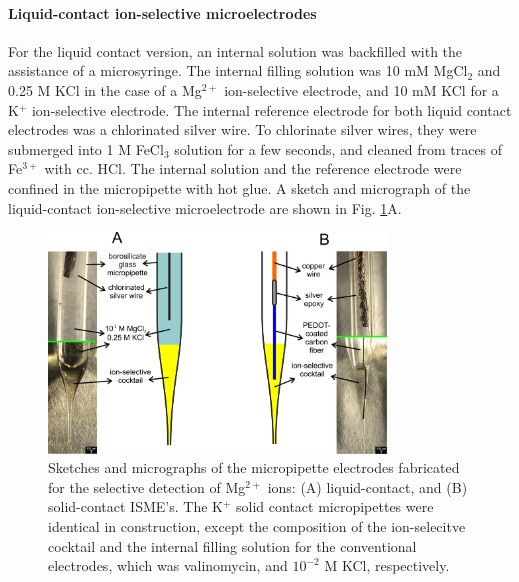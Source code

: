				\paragraph{Liquid-contact ion-selective microelectrodes}
For the liquid contact version, an internal solution was backfilled with the assistance of a microsyringe.
The internal filling solution was 10 mM MgCl$_2$ and 0.25 M KCl in the case of a Mg$^{2+}$ ion-selective electrode, and 10 mM KCl for a K$^+$ ion-selective electrode.
The internal reference electrode for both liquid contact electrodes was a chlorinated silver wire.
To chlorinate silver wires, they were submerged into 1 M FeCl$_3$ solution for a few seconds, and cleaned from traces of Fe$^{3+}$ with cc. HCl.
The internal solution and the reference electrode were confined in the micropipette with hot glue.
A sketch and micrograph of the liquid-contact ion-selective microelectrode are shown in Fig. \ref{fig:solid_liquid}A.

\begin{figure}
\centering
\includegraphics[width=0.8\textwidth]{img/liquid_solid.jpg}
\caption[Sketches and micrographs of the micropipette electrodes fabricated for the selective detection of Mg$^{2+}$ ions.]{Sketches and micrographs of the micropipette electrodes fabricated for the selective detection of Mg$^{2+}$ ions: (A) liquid-contact, and (B) solid-contact ISME's.
The K$^+$ solid contact micropipettes were identical in construction, except the composition of the ion-selecitve cocktail and the internal filling solution for the conventional electrodes, which was valinomycin, and $10^{-2}$ M KCl, respectively.}
\label{fig:solid_liquid}
\end{figure}

